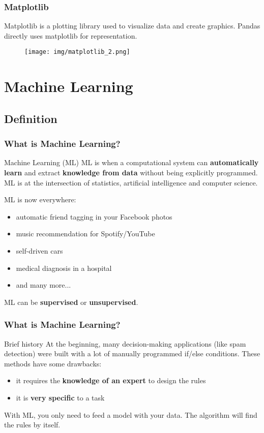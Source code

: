 \documentclass{beamer}
\begin{document}
\begin{frame}
  \frametitle{Matplotlib}
  Matplotlib is a plotting library used to visualize data and create graphics.
  Pandas directly uses matplotlib for representation.
  \begin{figure}[h]
    \texttt{[image: img/matplotlib\_2.png]}
  \end{figure}
\end{frame}



\section{Machine Learning}

\subsection{Definition}
\begin{frame}
  \frametitle{What is Machine Learning?}
  \begin{block}{Machine Learning (ML)}
    ML is when a computational system can \textbf{automatically learn} and
    extract \textbf{knowledge from data} without being explicitly programmed.
    ML is at the intersection of statistics, artificial intelligence and
    computer science.

    ML is now everywhere:
    \begin{itemize}
      \item automatic friend tagging in your Facebook photos
      \item music recommendation for Spotify/YouTube
      \item self-driven cars
      \item medical diagnosis in a hospital
      \item and many more...
    \end{itemize}
    ML can be \textbf{supervised} or \textbf{unsupervised}.
  \end{block}
\end{frame}

\begin{frame}
  \frametitle{What is Machine Learning?}
  \begin{alertblock}{Brief history}
    At the beginning, many decision-making applications (like spam detection)
    were built with a lot of manually programmed if/else conditions. These
    methods have some drawbacks:
    \begin{itemize}
      \item it requires the \textbf{knowledge of an expert} to design the rules
      \item it is \textbf{very specific} to a task
    \end{itemize}

    With ML, you only need to feed a model with your data. The algorithm will
    find the rules by itself.
  \end{alertblock}
\end{frame}
\end{document}
